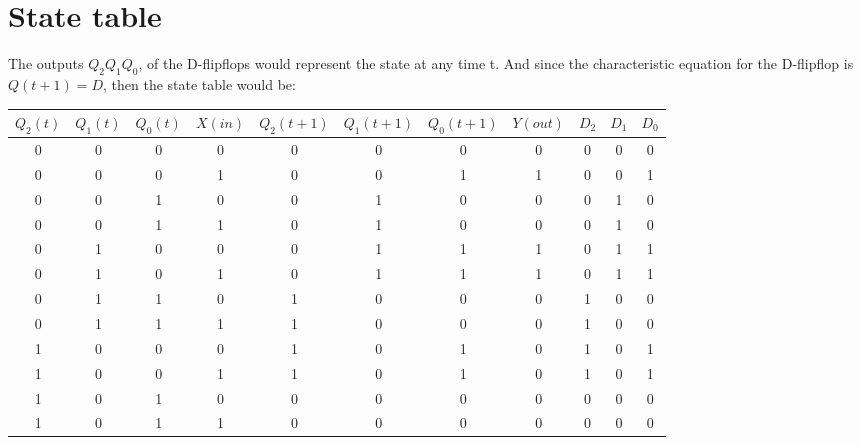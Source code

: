 \documentclass[a4paper]{article}
\begin{document}
\section{State table}
The outputs $Q_{2}Q_{1}Q_{0}$, of the D-flipflops would represent the state at any time t. And since the characteristic equation for the D-flipflop is $Q(t+1) = D$, then the state table would be:
\begin{center}
	\begin{tabular}{||c c c || c || c c c|| c ||c c c||}
		\hline
		$Q_{2}(t)$ & $Q_{1}(t)$ & $Q_{0}(t)$ & $X (in)$ & $Q_{2}(t+1)$ & $Q_{1}(t+1)$ & $Q_{0}(t+1)$ & $Y (out)$ & $D_{2}$ & $D_{1}$ & $D_{0}$ \\ [0.5ex]
		\hline
		\hline
		0&0&0&0&0&0&0&0&0&0&0  \\ \hline
    0&0&0&1&0&0&1&1&0&0&1  \\ \hline
    0&0&1&0&0&1&0&0&0&1&0  \\ \hline
    0&0&1&1&0&1&0&0&0&1&0  \\ \hline
    0&1&0&0&0&1&1&1&0&1&1  \\ \hline
    0&1&0&1&0&1&1&1&0&1&1  \\ \hline
    0&1&1&0&1&0&0&0&1&0&0  \\ \hline
    0&1&1&1&1&0&0&0&1&0&0  \\ \hline
    1&0&0&0&1&0&1&0&1&0&1  \\ \hline
    1&0&0&1&1&0&1&0&1&0&1  \\ \hline
    1&0&1&0&0&0&0&0&0&0&0  \\ \hline
		1&0&1&1&0&0&0&0&0&0&0  \\ 
		\hline
	\end{tabular}
\end{center}
\end{document}
